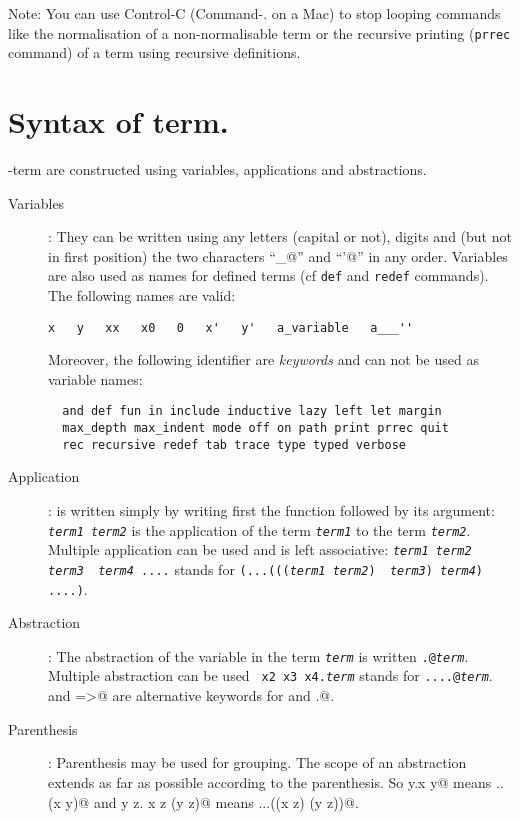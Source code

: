{{Note: You can use Control-C (Command-. on a Mac) to stop looping
commands like the normalisation of a non-normalisable term or the
recursive printing ({\tt prrec} command) of a term using recursive
definitions.

\section{Syntax of term.}

\TLambda-term are constructed using variables, applications and abstractions. 
\begin{description}
\item[Variables]: They can be written using any letters (capital or not),
  digits and (but not in first position) the two characters ``{\verb@_@}'' and
  ``{\verb@'@}'' in any order. Variables are also used as names for defined
  terms (cf {\tt def} and {\tt redef} commands). The following names are
  valid:
\begin{verbatim}
x   y   xx   x0   0   x'   y'   a_variable   a___'' 
\end{verbatim}
  Moreover, the following identifier are {\em keywords} and can not be used as
  variable names:
\begin{verbatim}
  and def fun in include inductive lazy left let margin 
  max_depth max_indent mode off on path print prrec quit 
  rec recursive redef tab trace type typed verbose
\end{verbatim}
  
\item[Application]: is written simply by writing first the function followed by
  its argument: {\tt {\it term1} {\it term2}} is the application of the term
  {\tt\it term1} to the term {\tt\it term2}. Multiple application can be used
  and is left associative: {\tt {\it term1} {\it term2} {\it term3} {\it
      term4} ....} stands for {\tt (...((({\it term1} {\it term2}) {\it
      term3}) {\it term4}) ....)}.
  
\item[Abstraction]: The abstraction of the variable {\verb@x@} in the term
  {\tt\it term} is written {\tt {\verb@\x.@}{\it term}}. Multiple abstraction
  can be used {\tt\verb@{} x2 x3 x4.{\it term}} stands for
  {\tt\verb@{}....@{\it term}}. \verb@fun@ and \verb@=>@ are
  alternative keywords for \verb@\@ and \verb@.@.

\item[Parenthesis]: Parenthesis may be used for grouping. The scope of an
  abstraction extends as far as possible according to the parenthesis.  So
  {\verb@\x y.x y@} means {\verb@\x.\y.(x y)@} and 
  {\verb@\x y z. x z (y z)@} means {\verb@\x.\y.\z.((x z) (y z))@}.
  

\end{description}}}
